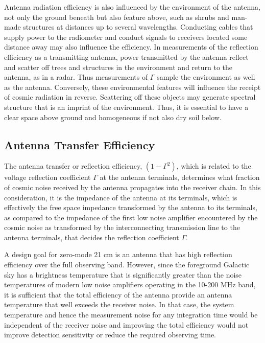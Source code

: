 Antenna radiation efficiency is also influenced by the environment of the antenna, not only the ground beneath but also feature above, such as shrubs and man-made structures at distances up to several wavelengths.  Conducting cables that supply power to the radiometer and conduct signals to receivers located some distance away may also influence the efficiency.  In measurements of the reflection efficiency as a transmitting antenna, power transmitted by the antenna reflect and scatter off trees and structures in the environment and return to the antenna, as in a radar. Thus measurements of $\Gamma$ sample the environment as well as the antenna.  Conversely, these environmental features will influence the receipt of cosmic radiation in reverse.  Scattering off these objects may generate spectral structure that is an imprint of the environment.  Thus, it is essential to have a clear space above ground and homogeneous if not also dry soil below.

\subsection{Antenna Transfer Efficiency}
   
   The antenna transfer or reflection efficiency, $(1-\Gamma^2)$, which is related to the voltage reflection coefficient $\Gamma$ at the antenna terminals, determines what fraction of cosmic noise received by the antenna propagates into the receiver chain.  In this consideration, it is the impedance of the antenna at its terminals, which is effectively the free space impedance transformed by the antenna to its terminals, as compared to the impedance of the first low noise amplifier encountered by the cosmic noise as transformed by the interconnecting transmission line to the antenna terminals, that decides the reflection coefficient $\Gamma$.  
   
   A design goal for zero-mode 21 cm is an antenna that has high reflection efficiency over the full observing band.  However, since the foreground Galactic sky has a brightness temperature that is significantly greater than the noise temperatures of modern low noise amplifiers operating in the 10-200 MHz band, it is sufficient that the total efficiency of the antenna provide an antenna temperature that well exceeds the receiver noise.  In that case, the system temperature and hence the measurement noise for any integration time would be independent of the receiver noise and improving the total efficiency would not improve detection sensitivity or reduce the required observing time.
   
